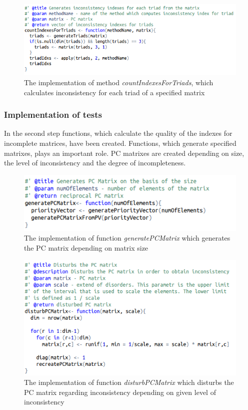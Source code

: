\begin{figure}[h]
\centerline{\includegraphics[scale=0.75]{images/kod5.png}}
\caption{The implementation of method \textit{countIndexesForTriads}, which calculates inconsistency for each triad of a specified matrix}
\label{fig:rstudio}
\end{figure}


\subsubsection{Implementation of tests}
In the second step functions, which calculate the quality of the indexes for incomplete matrices, have been created. Functions, which generate specified matrixes, plays an important role. PC matrixes are created depending on size, the level of inconsistency and the degree of incompleteness.

\begin{figure}[h]
\centerline{\includegraphics[scale=0.75]{images/kod11.png}}
\caption{The implementation of function \textit{generatePCMatrix} which generates the PC matrix depending on matrix size}
\label{fig:rstudio}
\end{figure}

\begin{figure}[h]
\centerline{\includegraphics[scale=0.75]{images/kod12.png}}
\caption{The implementation of function \textit{disturbPCMatrix} which disturbs the PC matrix regarding inconsistency depending on given level of inconsistency}
\label{fig:rstudio}
\end{figure}

